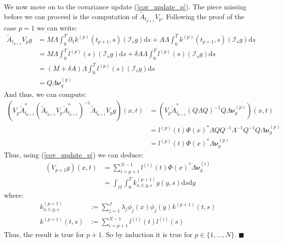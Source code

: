 \documentclass{article}
\renewcommand\qedsymbol{$\blacksquare$}
\theoremstyle{definition}
\theoremstyle{remark}
\theoremstyle{remark}
\begin{document}
\noindent We now move on to the covariance update (\ref{cov_update_p}). The piece missing before we can proceed is the computation of $\tilde{A}_{t_{p+1}}V_{p}$. Following the proof of the case $p=1$ we can write:
\begin{align}
    \tilde{A}_{t_{p+1}}V_{p}g &= M\Lambda\int_{0}^{T}\partial_{1}k^{(p)}(t_{p+1},s)(\mathcal{I}_{s}g)\mathrm{d}s + A\Lambda\int_{0}^{T}k^{(p)}(t_{p+1},s)(\mathcal{I}_{s}g)\mathrm{d}s \\
    &= M\Lambda\int_{0}^{T}l^{(p)}(s)(\mathcal{I}_{s}g)\mathrm{d}s + \delta A\Lambda\int_{0}^{T}l^{(p)}(s)(\mathcal{I}_{s}g)\mathrm{d}s \\
    &= (M+\delta A)\Lambda\int_{0}^{T}l^{(p)}(s)(\mathcal{I}_{s}g)\mathrm{d}s \\
    &= Q\Lambda\boldsymbol{\nu}_{g}^{(p)}
\end{align}
And thus, we can compute:
\begin{align*}
    (V_{p}\tilde{A}_{t_{p+1}}^{*}(\tilde{A}_{t_{p+1}}V_{p}\tilde{A}_{t_{p+1}}^{*})^{-1}\tilde{A}_{t_{p+1}}V_{p}g)(x,t) &=
    (V_{p}\tilde{A}_{t_{p+1}}^{*}(Q\Lambda Q)^{-1}Q\Lambda\boldsymbol{\nu}_{g}^{(p)})(x,t) \\
    &=l^{(p)}(t)\Phi(x)^{*}\Lambda Q Q^{-1}\Lambda^{-1}Q^{-1}Q\Lambda\boldsymbol{\nu}_{g}^{(p)} \\
    &=l^{(p)}(t)\Phi(x)^{*}\Lambda\boldsymbol{\nu}_{g}^{(p)}
\end{align*}
Thus, using (\ref{cov_update_p}) we can deduce:
\begin{align*}
    (V_{p+1}g)(x,t) &= \sum_{i=p+1}^{N-1}l^{(i)}(t)\Phi(x)^{*}\Lambda\boldsymbol{\nu}_{g}^{(i)} \\
    &= \int_{\Omega}\int_{0}^{T}k^{(p+1)}_{x,t,y,s}g(y,s)\mathrm{d}s\mathrm{d}y
\end{align*}
where:
\begin{align*}
    k^{(p+1)}_{x,t,y,s} &:= \sum_{j=1}^{J}\lambda_{j}\phi_{j}(x)\phi_{j}(y)k^{(p+1)}(t,s) \\
    k^{(p+1)}(t,s) &:= \sum_{i=p+1}^{N-1}l^{(i)}(t)l^{(i)}(s)
\end{align*}
Thus, the result is true for $p+1$. So by induction it is true for $p\in\{1,\dots,N\}$. \qedsymbol
\end{document}

